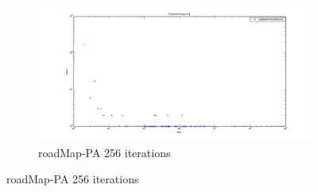 \begin{figure}
    \begin{subfigure}[htbp]{0.8\textwidth}
            \includegraphics[width=\textwidth]{FIG/cp-pa.png}
            \caption{roadMap-PA 256 iterations}
            \label{fig:cp-pa.png}
    \end{subfigure}
\end{figure}

\addtocounter{figure}{-1}

